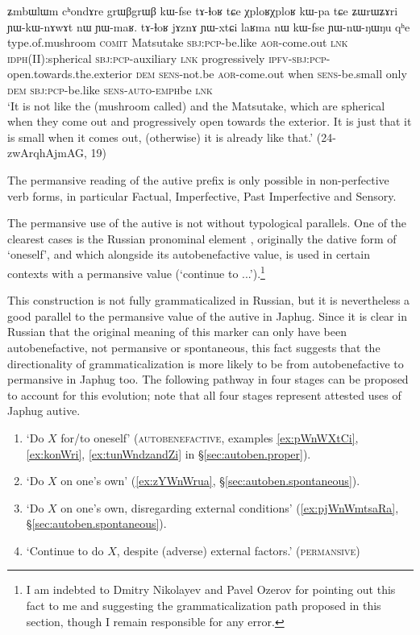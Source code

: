\begin{exe}
 \ex \label{ex:YWnWNWNu}
 \gll ʑmbɯlɯm cʰondɤre grɯβgrɯβ kɯ-fse tɤ-ɬoʁ tɕe χploʁχploʁ kɯ-pa tɕe ʑɯrɯʑɤri ɲɯ-kɯ-nɤwɤt nɯ ɲɯ-maʁ. tɤ-ɬoʁ jɤznɤ ɲɯ-xtɕi laʁma nɯ kɯ-fse ɲɯ-nɯ-ŋɯ\redp{}ŋu qʰe\\
type.of.mushroom \textsc{comit} Matsutake \textsc{sbj}:\textsc{pcp}-be.like \textsc{aor}-come.out \textsc{lnk} \textsc{idph(II):}spherical \textsc{sbj}:\textsc{pcp}-auxiliary \textsc{lnk} progressively \textsc{ipfv}-\textsc{sbj}:\textsc{pcp}-open.towards.the.exterior \textsc{dem} \textsc{sens}-not.be  \textsc{aor}-come.out when \textsc{sens}-be.small only \textsc{dem} \textsc{sbj}:\textsc{pcp}-be.like \textsc{sens}-\textsc{auto}-\textsc{emph}\redp{}be \textsc{lnk}\\
\glt `It is not like the (mushroom called)  and the Matsutake, which are spherical when they come out and progressively open towards the exterior. It is just that it is small when it comes out, (otherwise) it is already like that.'  (24-zwArqhAjmAG, 19)
 \end{exe}
 
The permansive reading of the autive prefix is only possible in non-perfective verb forms, in particular Factual, Imperfective, Past Imperfective and Sensory.

The permansive use of the autive  is not without typological parallels. One of the clearest cases is the Russian pronominal element , originally the dative form of  `oneself', and which alongside its autobenefactive value,  is used in certain contexts with a permansive value (`continue to ...').\footnote{I am indebted to Dmitry Nikolayev and Pavel Ozerov for pointing out this fact to me and suggesting the grammaticalization path proposed in this section, though I remain responsible for any error.}
 
This construction is not fully grammaticalized in Russian, but it is nevertheless a good parallel to the permansive value of the autive in Japhug. Since it is clear in Russian that the original meaning of this marker can only have been autobenefactive, not permansive or spontaneous, this fact suggests that the directionality of grammaticalization is more likely to be from autobenefactive to permansive in Japhug too. The following pathway in four stages can be proposed to account for this evolution; note that all four stages represent attested uses of Japhug autive.

\begin{enumerate}
\item `Do $X$ for/to oneself' (\textsc{autobenefactive}, examples \ref{ex:pWnWXtCi}, \ref{ex:konWri}, \ref{ex:tunWndzandZi} in §\ref{sec:autoben.proper}).  
\item `Do $X$ on one's own' (\ref{ex:zYWnWrua}, §\ref{sec:autoben.spontaneous}).
\item `Do $X$ on one's own, disregarding external conditions' (\ref{ex:pjWnWmtsaRa}, §\ref{sec:autoben.spontaneous}).
\item `Continue to do $X$, despite (adverse) external factors.' (\textsc{permansive})
\end{enumerate}
 
